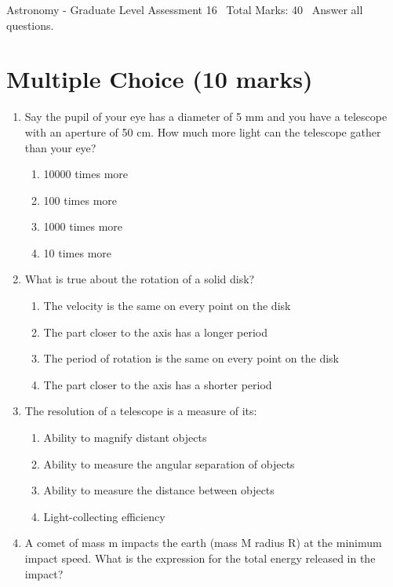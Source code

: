 \documentclass[12pt]{article}
\begin{document}
\begin{center}
Astronomy - Graduate Level Assessment 16 \
Total Marks: 40 \
Answer all questions.
\end{center}

\section*{Multiple Choice (10 marks)}
\begin{enumerate}[label=\arabic*.]
\item Say the pupil of your eye has a diameter of 5 mm and you have a telescope with an aperture of 50 cm. How much more light can the telescope gather than your eye?
\begin{enumerate}[label=(\alph*)]
    \item 10000 times more
    \item 100 times more
    \item 1000 times more
    \item 10 times more
\end{enumerate}
\item What is true about the rotation of a solid disk?
\begin{enumerate}[label=(\alph*)]
    \item The velocity is the same on every point on the disk
    \item The part closer to the axis has a longer period
    \item The period of rotation is the same on every point on the disk
    \item The part closer to the axis has a shorter period
\end{enumerate}
\item The resolution of a telescope is a measure of its:
\begin{enumerate}[label=(\alph*)]
    \item Ability to magnify distant objects
    \item Ability to measure the angular separation of objects
    \item Ability to measure the distance between objects
    \item Light-collecting efficiency
\end{enumerate}
\item A comet of mass m impacts the earth (mass M radius R) at the minimum impact speed. What is the expression for the total energy released in the impact?
\begin{enumerate}[label=(\alph*)]

\end{enumerate}
\end{enumerate}
\end{document}
